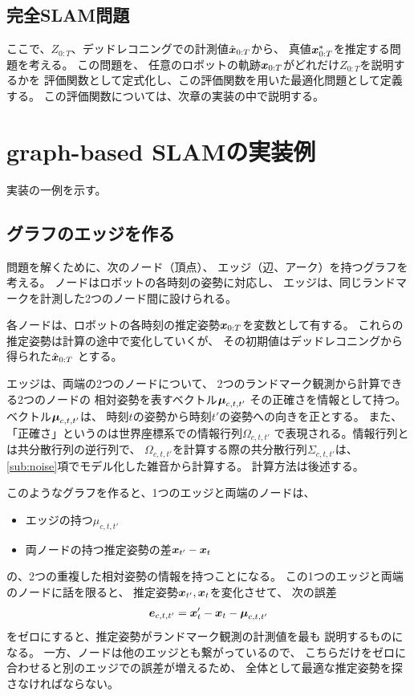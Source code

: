 \subsection{完全SLAM問題}\label{sub:fullslam}

ここで、$Z_{0:T}$、デッドレコニングでの計測値$\hat{\boldsymbol{x}}_{0:T}$から、
真値$\boldsymbol{x}_{0:T}^*$を推定する問題を考える。
この問題を、
任意のロボットの軌跡$\boldsymbol{x}_{0:T}$がどれだけ$Z_{0:T}$を説明するかを
評価関数として定式化し、この評価関数を用いた最適化問題として定義する。
この評価関数については、次章の実装の中で説明する。


\section{graph-based SLAMの実装例}

実装の一例を示す。

\subsection{グラフのエッジを作る}

問題を解くために、次のノード（頂点）、
エッジ（辺、アーク）を持つグラフを考える。
ノードはロボットの各時刻の姿勢に対応し、
エッジは、同じランドマークを計測した2つのノード間に設けられる。

各ノードは、ロボットの各時刻の推定姿勢$\boldsymbol{x}_{0:T}$を変数として有する。
これらの推定姿勢は計算の途中で変化していくが、
その初期値はデッドレコニングから得られた$\hat{\boldsymbol{x}}_{0:T}$
とする。

エッジは、両端の2つのノードについて、
2つのランドマーク観測から計算できる2つのノードの
相対姿勢を表すベクトル$\boldsymbol{\mu}_{c,t,t'}$
その正確さを情報として持つ。
ベクトル$\boldsymbol{\mu}_{c,t,t'}$は、
時刻$t$の姿勢から時刻$t'$の姿勢への向きを正とする。
また、「正確さ」というのは世界座標系での情報行列$\Omega_{c,t,t'}$
で表現される。情報行列とは共分散行列の逆行列で、
$\Omega_{c,t,t'}$を計算する際の共分散行列$\Sigma_{c,t,t'}$は、
\ref{sub:noise}項でモデル化した雑音から計算する。
計算方法は後述する。

このようなグラフを作ると、1つのエッジと両端のノードは、
\begin{itemize}
	\item エッジの持つ$\mu_{c,t,t'}$
	\item 両ノードの持つ推定姿勢の差$\boldsymbol{x}_{t'} - \boldsymbol{x}_t$
\end{itemize}
の、2つの重複した相対姿勢の情報を持つことになる。
この1つのエッジと両端のノードに話を限ると、
推定姿勢$\boldsymbol{x}_{t'},\boldsymbol{x}_t$を変化させて、
次の誤差
\begin{align}
	\boldsymbol{e}_{c,t,t'} = \boldsymbol{x}_t' - \boldsymbol{x}_t - \boldsymbol{\mu}_{c,t,t'}\label{eq:e}
\end{align}
をゼロにすると、推定姿勢がランドマーク観測の計測値を最も
説明するものになる。
一方、ノードは他のエッジとも繋がっているので、
こちらだけをゼロに合わせると別のエッジでの誤差が増えるため、
全体として最適な推定姿勢を探さなければならない。



